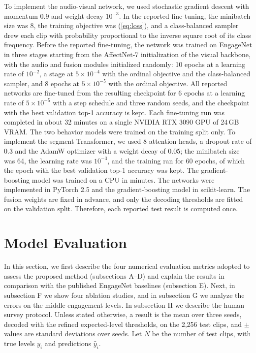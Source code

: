 \documentclass[journal]{IEEEtran}
\begin{document}
To implement the audio-visual network, we used stochastic gradient descent with momentum 0.9 and weight decay $10^{-3}$. In the reported fine-tuning, the minibatch size was 8, the training objective was (\ref{eq:loss}), and a class-balanced sampler drew each clip with probability proportional to the inverse square root of its class frequency. Before the reported fine-tuning, the network was trained on EngageNet in three stages starting from the AffectNet-7 initialization of the visual backbone, with the audio and fusion modules initialized randomly: 10 epochs at a learning rate of $10^{-2}$, a stage at $5 \times 10^{-4}$ with the ordinal objective and the class-balanced sampler, and 8 epochs at $5 \times 10^{-5}$ with the ordinal objective. All reported networks are fine-tuned from the resulting checkpoint for 6 epochs at a learning rate of $5 \times 10^{-5}$ with a step schedule and three random seeds, and the checkpoint with the best validation top-1 accuracy is kept. Each fine-tuning run was completed in about 32 minutes on a single NVIDIA RTX 3090 GPU of 24\,GB VRAM. The two behavior models were trained on the training split only. To implement the segment Transformer, we used 8 attention heads, a dropout rate of 0.3 and the AdamW optimizer with a weight decay of 0.05; the minibatch size was 64, the learning rate was $10^{-3}$, and the training ran for 60 epochs, of which the epoch with the best validation top-1 accuracy was kept. The gradient-boosting model was trained on a CPU in minutes. The networks were implemented in PyTorch 2.5 and the gradient-boosting model in scikit-learn. The fusion weights are fixed in advance, and only the decoding thresholds are fitted on the validation split. Therefore, each reported test result is computed once.

\section{Model Evaluation}
\label{sec:eval}

In this section, we first describe the four numerical evaluation metrics adopted to assess the proposed method (subsections A--D) and explain the results in comparison with the published EngageNet baselines (subsection E). Next, in subsection F we show four ablation studies, and in subsection G we analyze the errors on the middle engagement levels. In subsection H we describe the human survey protocol. Unless stated otherwise, a result is the mean over three seeds, decoded with the refined expected-level thresholds, on the 2,256 test clips, and $\pm$ values are standard deviations over seeds. Let $N$ be the number of test clips, with true levels $y_i$ and predictions $\hat{y}_i$.
\end{document}
